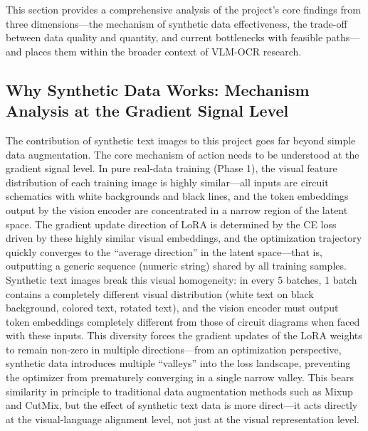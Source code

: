 This section provides a comprehensive analysis of the project's core findings from three dimensions---the mechanism of synthetic data effectiveness, the trade-off between data quality and quantity, and current bottlenecks with feasible paths---and places them within the broader context of VLM-OCR research.

\subsection{Why Synthetic Data Works: Mechanism Analysis at the Gradient Signal Level}

The contribution of synthetic text images to this project goes far beyond simple data augmentation. The core mechanism of action needs to be understood at the gradient signal level. In pure real-data training (Phase 1), the visual feature distribution of each training image is highly similar---all inputs are circuit schematics with white backgrounds and black lines, and the token embeddings output by the vision encoder are concentrated in a narrow region of the latent space. The gradient update direction of LoRA is determined by the CE loss driven by these highly similar visual embeddings, and the optimization trajectory quickly converges to the ``average direction'' in the latent space---that is, outputting a generic sequence (numeric string) shared by all training samples. Synthetic text images break this visual homogeneity: in every 5 batches, 1 batch contains a completely different visual distribution (white text on black background, colored text, rotated text), and the vision encoder must output token embeddings completely different from those of circuit diagrams when faced with these inputs. This diversity forces the gradient updates of the LoRA weights to remain non-zero in multiple directions---from an optimization perspective, synthetic data introduces multiple ``valleys'' into the loss landscape, preventing the optimizer from prematurely converging in a single narrow valley. This bears similarity in principle to traditional data augmentation methods such as Mixup and CutMix, but the effect of synthetic text data is more direct---it acts directly at the visual-language alignment level, not just at the visual representation level.

